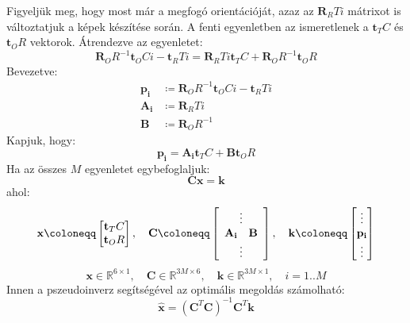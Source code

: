 	Figyeljük meg, hogy most már a megfogó orientációját, azaz az $\mathbf{R}_RTi$ mátrixot is változtatjuk a képek készítése során. A fenti egyenletben az ismeretlenek a $\mathbf{t}_TC$ és $\mathbf{t}_OR$ vektorok. Átrendezve az egyenletet:
	\begin{equation}
	\mathbf{R}_OR^{-1} \mathbf{t}_OCi -  \mathbf{t}_RTi =  \mathbf{R}_RTi\mathbf{t}_TC+\mathbf{R}_OR^{-1}\mathbf{t}_OR
	\end{equation}
	Bevezetve:
	\begin{equation}
	\begin{split}
	\mathbf{p_i} &\coloneqq \mathbf{R}_OR^{-1} \mathbf{t}_OCi -  \mathbf{t}_RTi \\
	\mathbf{A_i} &\coloneqq  \mathbf{R}_RTi\\
	\mathbf{B} &\coloneqq  \mathbf{R}_OR^{-1}
	\end{split}
	\end{equation}
	Kapjuk, hogy:
	\begin{equation}
	\mathbf{p_i} =  \mathbf{A_i}\mathbf{t}_TC+\mathbf{B}\mathbf{t}_OR
	\end{equation}
	Ha az összes $M$ egyenletet egybefoglaljuk:
	\begin{equation}
	\mathbf{Cx} = \mathbf{k}
	\end{equation}
	ahol:
	\begin{equation}
	\mathbf{x} \coloneqq \left[ \begin{matrix} \mathbf{t}_TC \\ \mathbf{t}_OR\end{matrix}	 \right], \quad
	\mathbf{C} \coloneqq  \left[ \begin{array}{cc} \multicolumn{2}{c}{\vdots} \\ \mathbf{A_i} & \mathbf{B} \\ \multicolumn{2}{c}{\vdots}  \end{array} \right], \quad
	\mathbf{k} \coloneqq  \left[ \begin{matrix} \vdots \\ \mathbf{p_i} \\ \vdots \end{matrix} \right] 
	\end{equation}
	\begin{equation*}
	\mathbf{x} \in \mathbb{R}^{6 \times 1}, \quad
	\mathbf{C} \in \mathbb{R}^{3M \times 6}, \quad
	\mathbf{k} \in \mathbb{R}^{3M \times 1}, \quad
	i = 1..M
	\end{equation*}
	Innen a pszeudoinverz segítségével az optimális megoldás számolható:
	\begin{equation}
	\hat{\mathbf{x}} = \left(\mathbf{C}^T \mathbf{C}\right)^{-1}\mathbf{C}^T\mathbf{k}
	\end{equation}
	
